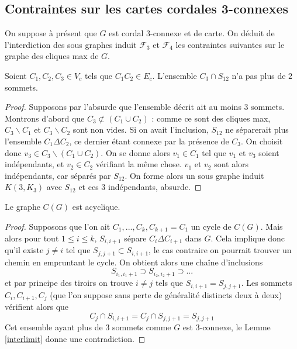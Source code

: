 \documentclass{scrartcl}
\begin{document}
\begin{flushleft}
\subsection{Contraintes sur les cartes cordales 3-connexes}

On suppose à présent que $G$ est cordal $3$-connexe et de carte.
On déduit de l'interdiction des sous graphes induit $\mathcal{F}_3$ et $\mathcal{F}_4$ les
contraintes suivantes sur le graphe des cliques max de $G$.

\begin{lem}\label{interlimit}
    Soient $C_1, C_2, C_3 \in V_c$ tels que $C_1C_2 \in E_c$. L'ensemble $C_3 \cap S_{12}$
    n'a pas plus de $2$ sommets.
\end{lem}

\begin{proof}
    Supposons par l'absurde que l'ensemble décrit ait au moins $3$ sommets. Montrons d'abord
    que $C_3 \not\subset (C_1 \cup C_2)$ : comme ce sont des cliques max, 
    $C_3 \backslash C_1$ et $C_3 \backslash C_2$ sont non vides. Si on avait l'inclusion,
    $S_{12}$ ne séparerait plus l'ensemble $C_1 \Delta C_2$, ce dernier étant connexe par
    la présence de $C_3$. \medskip \newline
    On choisit donc $v_3 \in C_3 \backslash (C_1 \cup C_2)$. On se donne alors
    $v_1 \in C_1$ tel que $v_1$ et $v_3$ soient indépendants, et $v_2 \in C_2$ vérifiant
    la même chose. $v_1$ et $v_2$ sont alors indépendants, car séparés par $S_{12}$. On
    forme alors un sous graphe induit $K(3, K_3)$ avec $S_{12}$ et ces $3$ indépendants, absurde.
\end{proof}

\begin{prop}
    Le graphe $C(G)$ est acyclique.
\end{prop}

\begin{proof}
    Supposons que l'on ait $C_1, ..., C_k, C_{k+1} = C_1$ un cycle de $C(G)$. Mais alors
    pour tout $1 \leq i \leq k$, $S_{i,i+1}$ sépare $C_i \Delta C_{i+1}$ dans $G$.
    Cela implique donc qu'il existe $j \neq i$ tel que $S_{j,j+1} \subset S_{i,i+1}$, le
    cas contraire on pourrait trouver un chemin en empruntant le cycle. On obtient alors
    une chaîne d'inclusions
    \[ S_{i_1, i_1+1} \supset S_{i_2, i_2+1} \supset ... \]
    et par principe des tiroirs on trouve $i \neq j$ tels que $S_{i,i+1} = S_{j,j+1}$.
    Les sommets $C_i, C_{i+1}, C_j$ (que l'on suppose sans perte de généralité distincts deux
    à deux) vérifient alors que
    \[ C_j \cap S_{i, i+1} = C_j \cap S_{j, j+1} = S_{j, j+1} \]
    Cet ensemble ayant plus de $3$ sommets comme $G$ est $3$-connexe, le Lemme \ref{interlimit}
    donne une contradiction.
\end{proof}


\end{flushleft}
\end{document}
